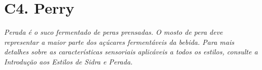 \section*{C4. Perry}
\textit{Perada é o suco fermentado de peras prensadas. O mosto de pera deve representar a maior parte dos açúcares fermentáveis da bebida. Para mais detalhes sobre as características sensoriais aplicáveis a todos os estilos, consulte a Introdução aos Estilos de Sidra e Perada.}